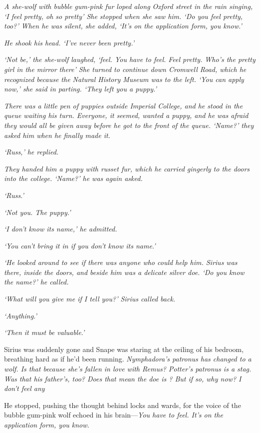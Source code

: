 \sbreak

\emph{A she-wolf with bubble gum-pink fur loped along Oxford street in the rain singing, `I feel pretty, oh so pretty{\el}' She stopped when she saw him. `Do you feel pretty, too?' When he was silent, she added, `It's on the application form, you know.'}

\emph{He shook his head. `I've never been pretty.'}

\emph{`Not be,' the she-wolf laughed, `feel. You have to feel. Feel pretty. Who's the pretty girl in the mirror there{\el}' She turned to continue down Cromwell Road, which he recognized because the Natural History Museum was to the left. `You can apply now,' she said in parting. `They left you a puppy.'}

\emph{There was a little pen of puppies outside Imperial College, and he stood in the queue waiting his turn. Everyone, it seemed, wanted a puppy, and he was afraid they would all be given away before he got to the front of the queue. `Name?' they asked him when he finally made it.}

\emph{`Russ,' he replied.}

\emph{They handed him a puppy with russet fur, which he carried gingerly to the doors into the college. `Name?' he was again asked.}

\emph{`Russ.'}

\emph{`Not you. The puppy.'}

\emph{`I don't know its name,' he admitted.}

\emph{`You can't bring it in if you don't know its name.'}

\emph{`He looked around to see if there was anyone who could help him. Sirius was there, inside the doors, and beside him was a delicate silver doe. `Do you know the name?' he called.}

\emph{`What will you give me if I tell you?' Sirius called back.}

\emph{`Anything.'}

\emph{`Then it must be valuable.'}

Sirius was suddenly gone and Snape was staring at the ceiling of his bedroom, breathing hard as if he'd been running. \emph{Nymphadora's patronus has changed to a wolf. Is that because she's fallen in love with Remus? Potter's patronus is a stag. Was that his father's, too? Does that mean the doe is{\el} ? But if so, why now? I don't feel any{\el}}

He stopped, pushing the thought behind locks and wards, for the voice of the bubble gum-pink wolf echoed in his brain—\emph{You have to feel. It's on the application form, you know.} 


